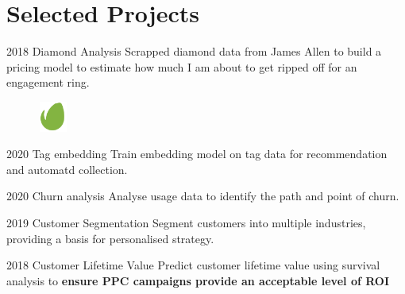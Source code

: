\documentclass{tccv}
\begin{document}



\section{Selected Projects}

\begin{yearlist}
\item{2018} {Diamond Analysis} {Scrapped diamond data from James Allen
  to build a pricing model to estimate how much I am about
  to get ripped off for an engagement ring.}

  
\end{yearlist}


\begin{figure}[h!] %
  \centering
  \includegraphics[width=1cm,height=1cm]{../company_icon/envato.png}
\end{figure}

\begin{yearlist}

\item{2020} {Tag embedding} {Train embedding model on tag data for
  recommendation and automatd collection.}

\item{2020} {Churn analysis} {Analyse usage data to identify the path
  and point of churn.}
  
\item{2019} {Customer Segmentation} {Segment customers into multiple
  industries, providing a basis for personalised strategy.}

\item{2018} {Customer Lifetime Value} {Predict customer lifetime
  value using survival analysis to \textbf{ensure PPC campaigns
    provide an acceptable level of ROI}}

\end{yearlist}
\end{document}

